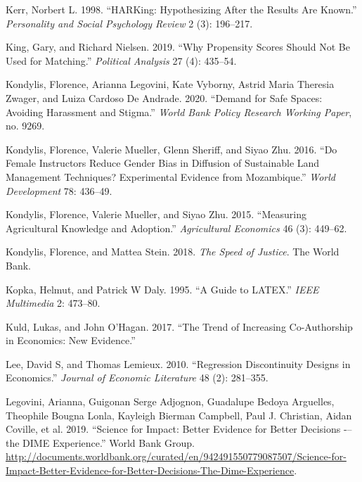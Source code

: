\documentclass[
]{book}
\begin{document}
\leavevmode\hypertarget{ref-kerr1998harking}{}%
Kerr, Norbert L. 1998. ``HARKing: Hypothesizing After the Results Are Known.'' \emph{Personality and Social Psychology Review} 2 (3): 196--217.

\leavevmode\hypertarget{ref-king2019propensity}{}%
King, Gary, and Richard Nielsen. 2019. ``Why Propensity Scores Should Not Be Used for Matching.'' \emph{Political Analysis} 27 (4): 435--54.

\leavevmode\hypertarget{ref-kondylis2020demand}{}%
Kondylis, Florence, Arianna Legovini, Kate Vyborny, Astrid Maria Theresia Zwager, and Luiza Cardoso De Andrade. 2020. ``Demand for Safe Spaces: Avoiding Harassment and Stigma.'' \emph{World Bank Policy Research Working Paper}, no. 9269.

\leavevmode\hypertarget{ref-kondylis2016female}{}%
Kondylis, Florence, Valerie Mueller, Glenn Sheriff, and Siyao Zhu. 2016. ``Do Female Instructors Reduce Gender Bias in Diffusion of Sustainable Land Management Techniques? Experimental Evidence from Mozambique.'' \emph{World Development} 78: 436--49.

\leavevmode\hypertarget{ref-kondylis2015measuring}{}%
Kondylis, Florence, Valerie Mueller, and Siyao Zhu. 2015. ``Measuring Agricultural Knowledge and Adoption.'' \emph{Agricultural Economics} 46 (3): 449--62.

\leavevmode\hypertarget{ref-kondylis2018speed}{}%
Kondylis, Florence, and Mattea Stein. 2018. \emph{The Speed of Justice}. The World Bank.

\leavevmode\hypertarget{ref-kopka1995guide}{}%
Kopka, Helmut, and Patrick W Daly. 1995. ``A Guide to LATEX.'' \emph{IEEE Multimedia} 2: 473--80.

\leavevmode\hypertarget{ref-kuldtrend}{}%
Kuld, Lukas, and John O'Hagan. 2017. ``The Trend of Increasing Co-Authorship in Economics: New Evidence.''

\leavevmode\hypertarget{ref-lee2010regression}{}%
Lee, David S, and Thomas Lemieux. 2010. ``Regression Discontinuity Designs in Economics.'' \emph{Journal of Economic Literature} 48 (2): 281--355.

\leavevmode\hypertarget{ref-legovini2019}{}%
Legovini, Arianna, Guigonan Serge Adjognon, Guadalupe Bedoya Arguelles, Theophile Bougna Lonla, Kayleigh Bierman Campbell, Paul J. Christian, Aidan Coville, et al. 2019. ``Science for Impact: Better Evidence for Better Decisions -\/-- the DIME Experience.'' World Bank Group. \url{http://documents.worldbank.org/curated/en/942491550779087507/Science-for-Impact-Better-Evidence-for-Better-Decisions-The-Dime-Experience}.
\end{document}
